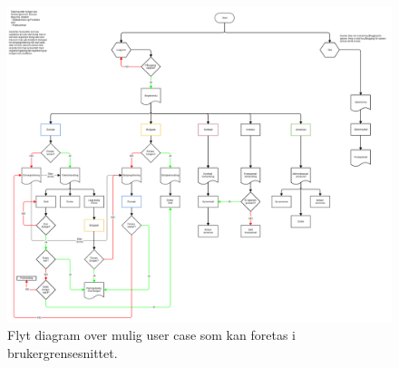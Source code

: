 \begin{figure}[ht]
 \includegraphics[angle=90 ,width=\textwidth,height=\textheight,keepaspectratio]{./img/appendix/diagram/user_case.png}
 \caption[Brukercase]{Flyt diagram over mulig user case som kan foretas i brukergrensesnittet.}
 \label{fig:user_case}
\end{figure}



